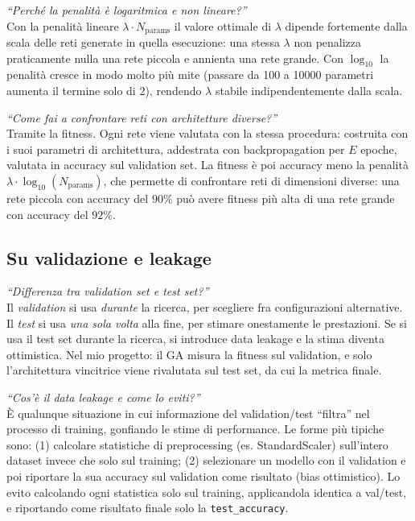 \documentclass[11pt,a4paper]{article}
\begin{document}
\begin{domanda}
\textit{``Perché la penalità è logaritmica e non lineare?''}\\
Con la penalità lineare $\lambda \cdot N_{\text{params}}$ il valore
ottimale di $\lambda$ dipende fortemente dalla scala delle reti generate
in quella esecuzione: una stessa $\lambda$ non penalizza praticamente
nulla una rete piccola e annienta una rete grande. Con $\log_{10}$ la
penalità cresce in modo molto più mite (passare da 100 a 10000
parametri aumenta il termine solo di $2$), rendendo $\lambda$ stabile
indipendentemente dalla scala.
\end{domanda}

\begin{domanda}
\textit{``Come fai a confrontare reti con architetture diverse?''}\\
Tramite la fitness. Ogni rete viene valutata con la stessa procedura:
costruita con i suoi parametri di architettura, addestrata con
backpropagation per $E$ epoche, valutata in accuracy sul validation set.
La fitness è poi accuracy meno la penalità $\lambda \cdot
\log_{10}(N_{\text{params}})$, che permette di confrontare reti di
dimensioni diverse: una rete piccola con accuracy del $90\%$ può avere
fitness più alta di una rete grande con accuracy del $92\%$.
\end{domanda}

\subsection{Su validazione e leakage}

\begin{domanda}
\textit{``Differenza tra validation set e test set?''}\\
Il \emph{validation} si usa \emph{durante} la ricerca, per scegliere fra
configurazioni alternative. Il \emph{test} si usa \emph{una sola volta}
alla fine, per stimare onestamente le prestazioni. Se si usa il test set
durante la ricerca, si introduce data leakage e la stima diventa
ottimistica. Nel mio progetto: il GA misura la fitness sul validation,
e solo l'architettura vincitrice viene rivalutata sul test set, da cui
la metrica finale.
\end{domanda}

\begin{domanda}
\textit{``Cos'è il data leakage e come lo eviti?''}\\
È qualunque situazione in cui informazione del validation/test ``filtra''
nel processo di training, gonfiando le stime di performance. Le forme
più tipiche sono: (1) calcolare statistiche di preprocessing (es.
StandardScaler) sull'intero dataset invece che solo sul training; (2)
selezionare un modello con il validation e poi riportare la sua accuracy
sul validation come risultato (bias ottimistico). Lo evito calcolando
ogni statistica solo sul training, applicandola identica a val/test, e
riportando come risultato finale solo la \texttt{test\_accuracy}.
\end{domanda}
\end{document}
